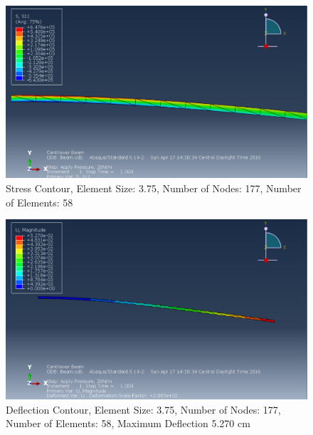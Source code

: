 \documentclass[a4paper]{article}
\begin{document}
\begin{figure}[ht]
\centering
\includegraphics[scale=.5]{6Nsize3_75Stress.PNG}
\caption{Stress Contour, Element Size: 3.75, Number of Nodes: 177, Number of Elements: 58}
\end{figure}
\begin{figure}[ht]
\centering
\includegraphics[scale=.5]{6Nsize3_75MDisplacement.PNG}
\caption{Deflection Contour, Element Size: 3.75, Number of Nodes: 177, Number of Elements: 58, Maximum Deflection 5.270 cm}
\end{figure}
\end{document}
